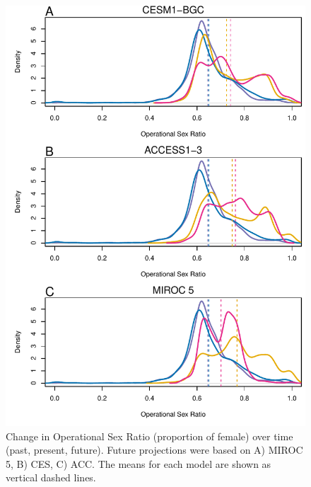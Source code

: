 \documentclass[12pt]{article}\usepackage[]{graphicx}\usepackage[dvipsnames]{xcolor}
\begin{document}


\begin{figure}[H]
	\begin{center}
		\includegraphics[width=0.80\linewidth]{Figures/POAR_OSR_MIROC_CES_ACC.pdf}
		\caption{Change in Operational Sex Ratio (proportion of female) over time (past, present, future).
			Future projections were based on A) MIROC 5, B) CES, C) ACC.
			The means for each model are shown as vertical dashed lines.}
		\label{Sup:osrall}
	\end{center}
\end{figure}
\end{document}
